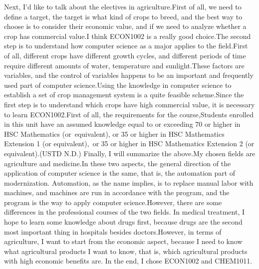 \documentclass{article}
\begin{document}
Next, I'd like to talk about the electives in agriculture.First of all, we need to define a target, the target is what kind of crops to breed, and the best way to choose is to consider their economic value, and if we need to analyze whether a crop has commercial value.I think ECON1002 is a really good choice.The second step is to understand how computer science as a major applies to the field.First of all, different crops have different growth cycles, and different periods of time require different amounts of water, temperature and sunlight.These factors are variables, and the control of variables happens to be an important and frequently used part of computer science.Using the knowledge in computer science to establish a set of crop management system is a quite feasible scheme.Since the first step is to understand which crops have high commercial value, it is necessary to learn ECON1002.First of all, the requirements for the course,Students enrolled in this unit have an assumed knowledge equal to or exceeding 70 or higher in HSC Mathematics (or equivalent), or 35 or higher in HSC Mathematics Extension 1 (or equivalent), or 35 or higher in HSC Mathematics Extension 2 (or equivalent).(USTD N.D.)
Finally, I will summarize the above.My chosen fields are agriculture and medicine.In these two aspects, the general direction of the application of computer science is the same, that is, the automation part of modernization. Automation, as the name implies, is to replace manual labor with machines, and machines are run in accordance with the program, and the program is the way to apply computer science.However, there are some differences in the professional courses of the two fields. In medical treatment, I hope to learn some knowledge about drugs first, because drugs are the second most important thing in hospitals besides doctors.However, in terms of agriculture, I want to start from the economic aspect, because I need to know what agricultural products I want to know, that is, which agricultural products with high economic benefits are. In the end, I chose ECON1002 and CHEM1011.
\end{document}
